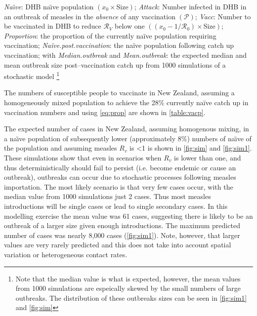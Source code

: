 \documentclass{article}
\newcommand{\Pe}{\mathcal{P}}
\newcommand{\Ro}{\mathcal{R}_0}
\newcommand{\Rr}{\mathcal{R}}
\begin{document}
\begin{table}
{\textit{Na\"{\i}ve}:		DHB na\"{\i}ve population $\left(x_0\times\text{Size}\right)$;		
\textit{Attack}:	  Number infected in DHB in an outbreak of measles in the \textit{absence} of any vaccination $\left(\Pe\right)$;
\textit{Vacc}:		Number to be vaccinated in DHB to reduce $\Rr_V$ below one  $\left(\left(x_0-1/\Ro\right)\times\text{Size}\right)$; \textit{Proportion}: the proportion of the currently na\"{i}ve population requiring vaccination; \textit{Na\"{i}ve.post.vaccination}: the na\"{i}ve population following catch up vaccination; with \textit{Median.outbreak} and \textit{Mean.outbreak}: the expected median and mean outbreak size post--vaccination catch up from 1000 simulations of a stochastic model}
\footnote{Note that the median value is what is expected, however, the mean values from 1000 simulations are espeically skewed by the small numbers of large outbreaks. The distribution of these outbreaks sizes can be seen in \autoref{fig:sim1} and \autoref{fig:sim}}
\label{table:vacp}
\end{table}

The numbers of susceptible people to vaccinate in New Zealand, assuming a homogeneously mixed population to achieve the 28\% currently na\"{i}ve catch up in vaccination numbers and using \autoref{eq:prop} are shown in \autoref{table:vacp}.

The expected number of cases in New Zealand, assuming homogenous mixing, in a na\"{\i}ve population of subsequently lower (approximately 8\%) numbers of na\"{\i}ve of the population and assuming measles $R_v$ is <1 is shown in \autoref{fig:sim} and \autoref{fig:sim1}. These simulations show that even in scenarios when $R_v$ is lower than one, and thus deterministically should fail to persist (i.e. become endemic or cause an outbreak), outbreaks can occur due to stochastic processes following measles importation. The most likely scenario is that very few cases occur, with the median value from 1000 simulations just 2 cases. Thus most measles introductions will be single cases or lead to single secondary cases. In this modelling exercise the mean value was 61 cases, suggesting there is likely to be an outbreak of a larger size given enough introductions. The maximum predicted number of cases was nearly 8,000 cases (\autoref{fig:sim1}). Note, however, that larger values are very rarely predicted and this does not take into account spatial variation or heterogeneous contact rates.
\end{document}
